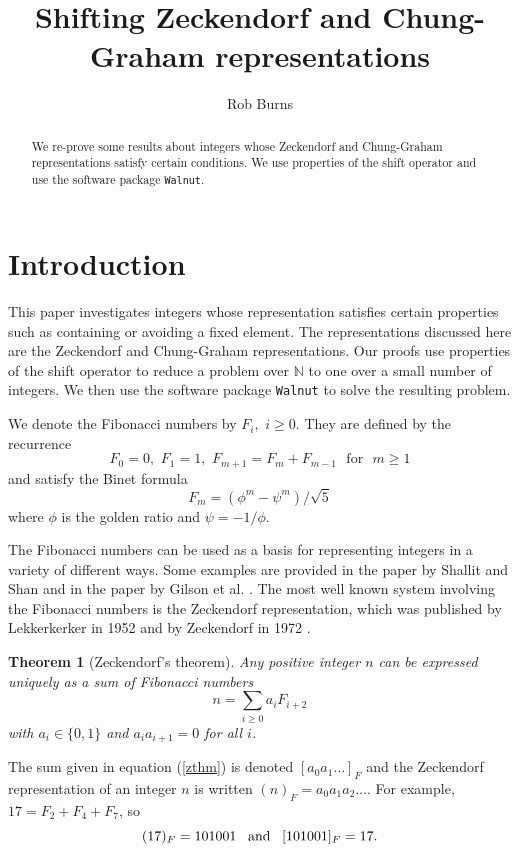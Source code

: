 \documentclass[12pt]{article}
\title{Shifting Zeckendorf and Chung-Graham representations}
\author{Rob Burns}
\theoremstyle{plain}
\newtheorem{theorem}{Theorem}
\theoremstyle{case}
\theoremstyle{definition}
\begin{document}
\maketitle
\begin{abstract}
We re-prove some results about integers whose Zeckendorf and Chung-Graham representations satisfy certain conditions. We use properties of the shift operator and use the software package {\tt Walnut}.
\end{abstract}

\section{Introduction}
\label{intro}
This paper investigates integers whose representation satisfies certain properties such as containing or avoiding a fixed element. The representations discussed here are the Zeckendorf and Chung-Graham representations. Our proofs use properties of the shift operator to reduce a problem over $\mathbb{N}$ to one over a small number of integers. We then use the software package {\tt Walnut} to solve the resulting problem.

We denote the Fibonacci numbers by $F_i, \,\, i\geq 0$. They are defined by the recurrence
$$
F_0 = 0, \,\, F_1 = 1, \,\, F_{m+1} = F_{m} + F_{m-1} \,\, \text{ for } \,\, m \geq 1
$$
and satisfy the Binet formula
$$
F_m = (\phi^m - \psi^m)/\sqrt{5}
$$
where $\phi$ is the golden ratio and $\psi = -1/\phi$.

The Fibonacci numbers can be used as a basis for representing integers in a variety of different ways. Some examples are provided in the paper \cite{Shallit:2023aa} by Shallit and Shan and in the paper by Gilson et al. \cite{Gilson:2020aa}. The most well known system involving the Fibonacci numbers is the Zeckendorf representation, which was published by Lekkerkerker in 1952 \cite{lekk} and by Zeckendorf in 1972 \cite{zeck}.

\bigskip

\begin{theorem}[Zeckendorf's theorem]
Any positive integer $n$ can be expressed uniquely as a sum of Fibonacci numbers 
\begin{equation}
\label{zthm}
n = \sum_{i \geq 0} a_i F_{i+2}
\end{equation}
with $a_i \in \{0,1\}$ and $a_i a_{i+1} = 0$ for all $i$.
\end{theorem}

\bigskip
The sum given in equation (\ref{zthm}) is denoted $[a_0 a_1 \dots]_F$ and the Zeckendorf representation of an integer $n$ is written $(n)_F = a_0 a_1 a_2 \dots$. For example, $17 = F_2 + F_ 4 + F_7$, so  
$$
(17)_F = 1 0 1 0 0 1 \text{ \, and \, } [1 0 1 0 0 1]_F = 17.
$$
\end{document}
